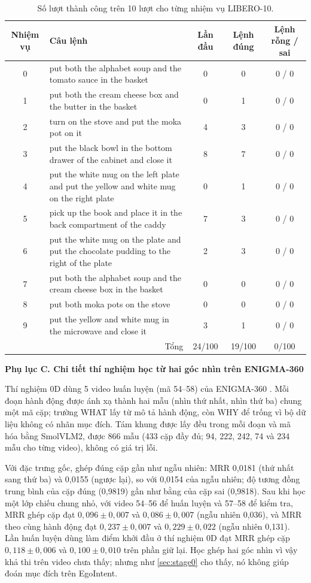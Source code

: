 \documentclass[a4paper,oneside]{report}
\newcommand{\mucnho}[1]{\par\vspace{4pt}\noindent\textbf{#1}\par\nobreak}
\begin{document}
\begin{table}[ht]
\centering
\caption{Số lượt thành công trên 10 lượt cho từng nhiệm vụ LIBERO-10.}
\label{tab:libero_task}
\small
\begin{tabularx}{\linewidth}{c X c c c}
\toprule
Nhiệm vụ & Câu lệnh & Lần đầu & Lệnh đúng & Lệnh rỗng / sai \\
\midrule
0 & put both the alphabet soup and the tomato sauce in the basket & 0 & 0 & 0 / 0 \\
1 & put both the cream cheese box and the butter in the basket & 0 & 1 & 0 / 0 \\
2 & turn on the stove and put the moka pot on it & 4 & 3 & 0 / 0 \\
3 & put the black bowl in the bottom drawer of the cabinet and close it & 8 & 7 & 0 / 0 \\
4 & put the white mug on the left plate and put the yellow and white mug on the right plate & 0 & 1 & 0 / 0 \\
5 & pick up the book and place it in the back compartment of the caddy & 7 & 3 & 0 / 0 \\
6 & put the white mug on the plate and put the chocolate pudding to the right of the plate & 2 & 3 & 0 / 0 \\
7 & put both the alphabet soup and the cream cheese box in the basket & 0 & 0 & 0 / 0 \\
8 & put both moka pots on the stove & 0 & 0 & 0 / 0 \\
9 & put the yellow and white mug in the microwave and close it & 3 & 1 & 0 / 0 \\
\midrule
\multicolumn{2}{r}{Tổng} & 24/100 & 19/100 & 0/100 \\
\bottomrule
\end{tabularx}
\end{table}

\mucnho{Phụ lục C. Chi tiết thí nghiệm học từ hai góc nhìn trên ENIGMA-360}

Thí nghiệm 0D dùng 5 video huấn luyện (mã 54--58) của ENIGMA-360 \citep{ragusa2026enigma360}. Mỗi đoạn hành động được ánh xạ thành hai mẫu (nhìn thứ nhất, nhìn thứ ba) chung một mã cặp; trường WHAT lấy từ mô tả hành động, còn WHY để trống vì bộ dữ liệu không có nhãn mục đích. Tám khung được lấy đều trong mỗi đoạn và mã hóa bằng SmolVLM2, được 866 mẫu (433 cặp đầy đủ; 94, 222, 242, 74 và 234 mẫu cho từng video), không có giá trị lỗi.

Với đặc trưng gốc, ghép đúng cặp gần như ngẫu nhiên: MRR 0,0181 (thứ nhất sang thứ ba) và 0,0155 (ngược lại), so với 0,0154 của ngẫu nhiên; độ tương đồng trung bình của cặp đúng (0,9819) gần như bằng của cặp sai (0,9818). Sau khi học một lớp chiếu chung nhỏ, với video 54--56 để huấn luyện và 57--58 để kiểm tra, MRR ghép cặp đạt $0{,}096\pm0{,}007$ và $0{,}086\pm0{,}007$ (ngẫu nhiên 0,036), và MRR theo cùng hành động đạt $0{,}237\pm0{,}007$ và $0{,}229\pm0{,}022$ (ngẫu nhiên 0,131). Lần huấn luyện dùng làm điểm khởi đầu ở thí nghiệm 0D đạt MRR ghép cặp $0{,}118\pm0{,}006$ và $0{,}100\pm0{,}010$ trên phần giữ lại. Học ghép hai góc nhìn vì vậy khả thi trên video chưa thấy; nhưng như \cref{sec:stage0} cho thấy, nó không giúp đoán mục đích trên EgoIntent.
\end{document}
